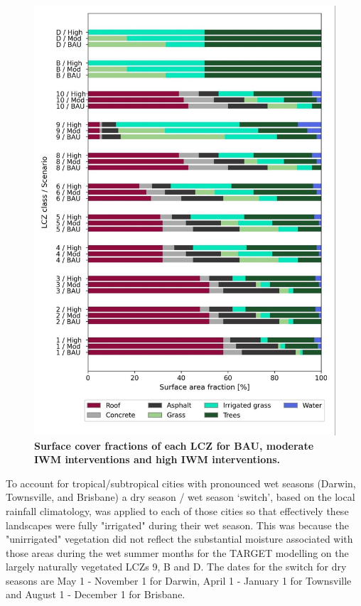 \documentclass[final,3p,times,authoryear]{elsarticle}
\begin{document}
\begin{figure}
\centering
\includegraphics[trim={0 0 0 0},clip,scale=0.20]{images/image7.jpg}
\caption{\bf Surface cover fractions of each LCZ for BAU, moderate IWM interventions and high IWM interventions.}
 \label{fig:surflcz}
\end{figure}

To account for tropical/subtropical cities with pronounced wet seasons (Darwin, Townsville, and Brisbane) a dry season / wet season `switch', based on the local rainfall climatology, was applied to each of those cities so that effectively these landscapes were fully "irrigated" during their wet season. This was because the "unirrigated" vegetation did not reflect the substantial moisture associated with those areas during the wet summer months for the TARGET modelling on the largely naturally vegetated LCZs 9, B and D. The dates for the switch for dry seasons are May 1 - November 1 for Darwin, April 1 - January 1 for Townsville and August 1 - December 1 for Brisbane. 
\end{document}
